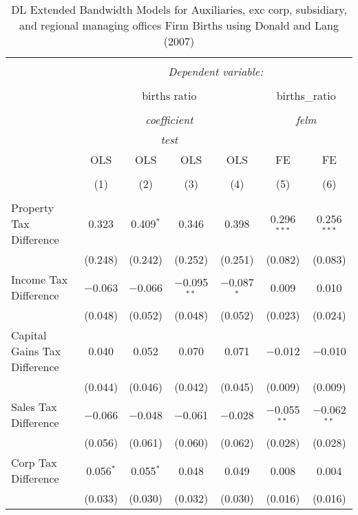
\begin{table}[!htbp] \centering 
  \caption{DL Extended Bandwidth Models for  Auxiliaries, exc corp, subsidiary, and regional managing offices Firm Births using Donald and Lang (2007)} 
  \label{} 
\begin{tabular}{@{\extracolsep{5pt}}lcccccc} 
\\[-1.8ex]\hline 
\hline \\[-1.8ex] 
 & \multicolumn{6}{c}{\textit{Dependent variable:}} \\ 
\cline{2-7} 
\\[-1.8ex] & \multicolumn{4}{c}{births ratio} & \multicolumn{2}{c}{births\_ratio} \\ 
\\[-1.8ex] & \multicolumn{4}{c}{\textit{coefficient}} & \multicolumn{2}{c}{\textit{felm}} \\ 
 & \multicolumn{4}{c}{\textit{test}} & \multicolumn{2}{c}{\textit{}} \\ 
 & OLS & OLS & OLS & OLS & FE & FE \\ 
\\[-1.8ex] & (1) & (2) & (3) & (4) & (5) & (6)\\ 
\hline \\[-1.8ex] 
 Property Tax Difference & 0.323 & 0.409$^{*}$ & 0.346 & 0.398 & 0.296$^{***}$ & 0.256$^{***}$ \\ 
  & (0.248) & (0.242) & (0.252) & (0.251) & (0.082) & (0.083) \\ 
  Income Tax Difference & $-$0.063 & $-$0.066 & $-$0.095$^{**}$ & $-$0.087$^{*}$ & 0.009 & 0.010 \\ 
  & (0.048) & (0.052) & (0.048) & (0.052) & (0.023) & (0.024) \\ 
  Capital Gains Tax Difference & 0.040 & 0.052 & 0.070 & 0.071 & $-$0.012 & $-$0.010 \\ 
  & (0.044) & (0.046) & (0.042) & (0.045) & (0.009) & (0.009) \\ 
  Sales Tax Difference & $-$0.066 & $-$0.048 & $-$0.061 & $-$0.028 & $-$0.055$^{**}$ & $-$0.062$^{**}$ \\ 
  & (0.056) & (0.061) & (0.060) & (0.062) & (0.028) & (0.028) \\ 
  Corp Tax Difference & 0.056$^{*}$ & 0.055$^{*}$ & 0.048 & 0.049 & 0.008 & 0.004 \\ 
  & (0.033) & (0.030) & (0.032) & (0.030) & (0.016) & (0.016) \\ 

\end{tabular}
\end{table}
